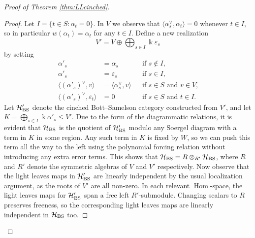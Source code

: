 \documentclass{amsart}
\theoremstyle{plain}
\theoremstyle{definition}
\theoremstyle{remark}
\numberwithin{equation}{section}
\DeclareMathOperator{\Hom}{Hom}
\begin{document}
\begin{proof}[Proof of Theorem \ref{thm:LLcinched}]
\begin{proof}
Let $I=\{t \in S : \alpha_t=0\}$. 
In $V$ we observe that $\langle \alpha^\vee_s,\alpha_t \rangle=0$ whenever $t \in I$, so in particular $w(\alpha_t)=\alpha_t$ for any $t \in I$.
Define a new realization
\begin{equation*}
V'=V \oplus \bigoplus_{s \in I} \Bbbk \varepsilon_s
\end{equation*}
by setting
\begin{align*}
\alpha'_s& =\alpha_s & &\text{if $s \notin I$,} \\
\alpha'_s& =\varepsilon_s & &\text{if $s \in I$,} \\
\langle (\alpha'_s)^\vee, v \rangle& =\langle \alpha_s^\vee, v\rangle & &  \text{if  $s \in S$ and $v \in V$,} \\
\langle (\alpha'_s)^\vee, \varepsilon_t\rangle & =0 & &  \text{if $s \in S$ and $t \in I$.}
\end{align*}
Let $\mathcal{H}'_{\rm BS}$ denote the cinched Bott--Samelson category constructed from $V'$, and let $K=\bigoplus_{s \in I} \Bbbk \alpha'_s \leq V'$.
Due to the form of the diagrammatic relations, it is evident that $\mathcal{H}_{\rm BS}$ is the quotient of $\mathcal{H}'_{\rm BS}$ modulo any Soergel diagram with a term in $K$ in some region. 
Any such term in $K$ is fixed by $W$, so we can push this term all the way to the left using the polynomial forcing relation \cite[(5.2)]{EW-SoergelCalc} without introducing any extra error terms.
This shows that $\mathcal{H}_{\rm BS} = R \otimes_{R'} \mathcal{H}_{\rm BS}$, where $R$ and $R'$ denote the symmetric algebras of $V$ and $V'$ respectively.  
Now observe that the light leaves maps in $\mathcal{H}'_{\rm BS}$ are linearly independent by the usual localization argument, as the roots of $V'$ are all non-zero.
In each relevant $\Hom$-space, the light leaves maps for $\mathcal{H}'_{\rm BS}$ span a free left $R'$-submodule. 
Changing scalars to $R$ preserves freeness, so the corresponding light leaves maps are linearly independent in $\mathcal{H}_{\rm BS}$ too.
\end{proof}


\end{proof}
\end{document}
